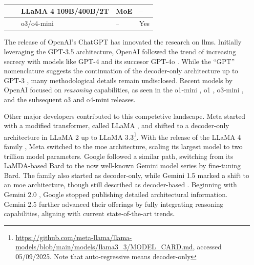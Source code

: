 \begin{table}[htbp]
\begin{tabularx}{\textwidth}{|>{\bfseries\centering\arraybackslash}p{2.5cm}|>{\centering\arraybackslash}p{2.25cm}|>{\centering\arraybackslash}p{4.5cm}|>{\centering\arraybackslash}p{3cm}|>{\centering\arraybackslash}X|}
        \hline
        \multirow{2}{*}{Apr 2025}        & \cellcolor{metaColor}{\textbf{Meta}}           & LLaMA 4 109B/400B/2T    & MoE                   & -- \\ %
        \cline{2-5}
                                         & \cellcolor{openaiColor}{\textbf{OpenAI}}       & o3/o4-mini              & --                     & Yes \\ %
        \hline
    \end{tabularx}
\end{table}

\pagebreak

The release of OpenAI's ChatGPT \cite{openai_introducing_2022} has innovated the research on \ac{llms}. Initially leveraging the GPT-3.5 architecture, OpenAI followed the trend of increasing secrecy with models like GPT-4 \cite{openai_gpt-4_2024} and its succesor GPT-4o \cite{openai_gpt-4o_2024}. While the \enquote{GPT} nomenclature suggests the continuation of the decoder-only architecture up to GPT-3 \cite{brown_language_2020}, many methodological details remain undisclosed. Recent models by OpenAI focused on \textit{reasoning} capabilities, as seen in the o1-mini \cite{openai_openai_2024}, o1 \cite{openai_openai_2024-1}, o3-mini \cite{openai_openai_2025}, and the subsequent o3 and o4-mini \cite{openai_openai_2025-1} releases.

Other major developers contributed to this competetive landscape. Meta started with a modified transformer, called LLaMA \cite{touvron_llama_2023}, and shifted to a decoder-only architecture in LLaMA 2 \cite{touvron_llama_2023-1} up to LLaMA 3.3\footnote{\url{https://github.com/meta-llama/llama-models/blob/main/models/llama3_3/MODEL_CARD.md}, accessed 05/09/2025. Note that auto-regressive means decoder-only}. With the release of the LLaMA 4 family \cite{meta_ai_llama_2025}, Meta switched to the \ac{moe} architecture, scaling its largest model to two trillion model parameters. Google followed a similar path, switching from its LaMDA-based Bard \cite{pichai_important_2023,thoppilan_lamda_2022} to the now well-known Gemini model series \cite{team_gemini_2024} by fine-tuning Bard. The family also started as decoder-only, while Gemini 1.5 marked a shift to an \ac{moe} architecture, though still described as decoder-based \cite{team_gemini_2024-1}. Beginning with Gemini 2.0 \cite{pichai_introducing_2024}, Google stopped publishing detailed architectural information. Gemini 2.5 \cite{kavukcuoglu_gemini_2025} further advanced their offerings by fully integrating reasoning capabilities, aligning with current state-of-the-art trends.

